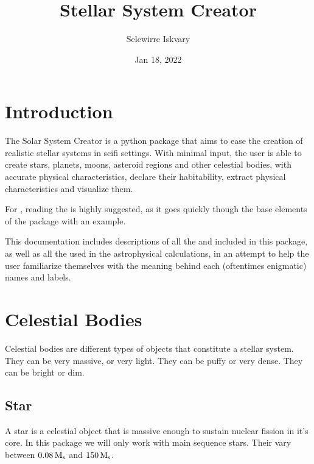 \documentclass[letterpaper,10pt,english]{sphinxmanual}
\title{Stellar System Creator}
\date{Jan 18, 2022}
\author{Selewirre Iskvary}
\begin{document}
\pagestyle{empty}
\sphinxmaketitle
\pagestyle{plain}
\sphinxtableofcontents
\pagestyle{normal}
\label{\detokenize{index::doc}}



\chapter{Introduction}
\label{\detokenize{introduction:introduction}}\label{\detokenize{introduction::doc}}
\sphinxAtStartPar
The Solar System Creator is a python package that aims to ease the creation of realistic
stellar systems in sci\sphinxhyphen{}fi settings. With minimal input, the user is able to create stars, planets,
moons, asteroid regions and other celestial bodies, with accurate physical characteristics, declare their habitability,
extract physical characteristics and visualize them.

\sphinxAtStartPar
For , reading the {\hyperref[\detokenize{gui/gui:id1}]{}} is highly suggested,
as it goes quickly though the base elements of the package with an example.

\sphinxAtStartPar
This documentation includes descriptions of all the {\hyperref[\detokenize{celestial_bodies/celestial_bodies:id1}]{}}
and {\hyperref[\detokenize{celestial_systems/celestial_systems:id1}]{}} included in this package, as well as all the
{\hyperref[\detokenize{quantities/quantities:id1}]{}} used in the astrophysical calculations, in an attempt to help
the user familiarize themselves with the meaning behind each (oftentimes enigmatic) names and labels.


\chapter{Celestial Bodies}
\label{\detokenize{celestial_bodies/celestial_bodies:celestial-bodies}}\label{\detokenize{celestial_bodies/celestial_bodies::doc}}\label{\detokenize{celestial_bodies/celestial_bodies:id1}}
\sphinxAtStartPar
Celestial bodies are different types of objects that constitute a stellar system.
They can be very massive, or very light. They can be puffy or very dense.
They can be bright or dim.


\section{Star}
\label{\detokenize{celestial_bodies/star:star}}\label{\detokenize{celestial_bodies/star::doc}}\label{\detokenize{celestial_bodies/star:id1}}
\sphinxAtStartPar
A star is a celestial object that is massive enough to sustain nuclear fission in it’s core.
In this package we will only work with main sequence stars.
Their {\hyperref[\detokenize{quantities/material/mass:id1}]{}} vary between \(0.08 \, {\rm M_s}\) and \(150 \, {\rm M_s}\).
\end{document}
